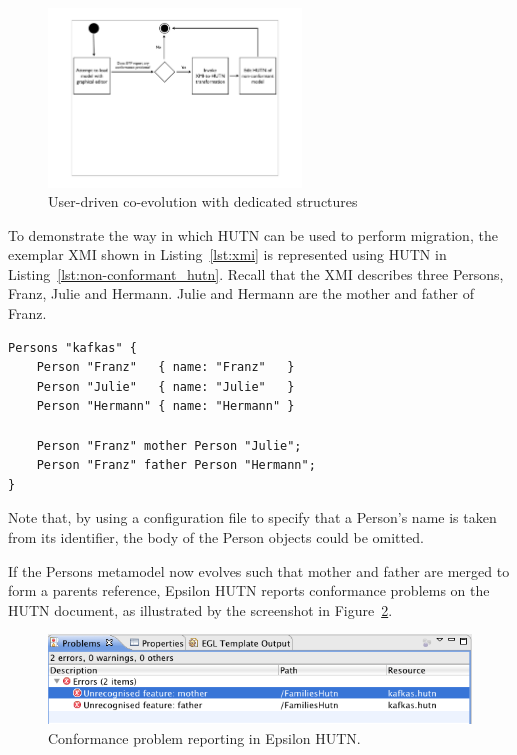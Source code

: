 \begin{figure}[htbp]
	\centering
	\includegraphics*[viewport=80 290 760 550,height=4.75cm]{6.Evaluation/images/user_driven/hutn_process.pdf}
	\caption{User-driven co-evolution with dedicated structures}
	\label{fig:hutn_process_implementation}
\end{figure}

To demonstrate the way in which HUTN can be used to perform migration, the exemplar XMI shown in Listing~\ref{lst:xmi} is represented using HUTN in Listing~\ref{lst:non-conformant_hutn}. Recall that the XMI describes three Persons, Franz, Julie and Hermann. Julie and Hermann are the mother and father of Franz.

\begin{lstlisting}[caption=HUTN for people with mothers and fathers., label=lst:non-conformant_hutn, language=HutnFamilies]
Persons "kafkas" {
    Person "Franz"   { name: "Franz"   }
    Person "Julie"   { name: "Julie"   }
    Person "Hermann" { name: "Hermann" }
    
    Person "Franz" mother Person "Julie";
    Person "Franz" father Person "Hermann";
}
\end{lstlisting}

Note that, by using a configuration file to specify that a Person's name is taken from its identifier, the body of the Person objects could be omitted.

If the Persons metamodel now evolves such that mother and father are merged to form a parents reference, Epsilon HUTN reports conformance problems on the HUTN document, as illustrated by the screenshot in Figure~\ref{fig:hutn_conformance_reporting}.

\begin{figure}[htbp]
  \begin{center}
    \leavevmode
    \includegraphics[scale=0.44]{5.Implementation/hutn_conformance_reporting.png}
  \end{center}
  \caption{Conformance problem reporting in Epsilon HUTN.}
  \label{fig:hutn_conformance_reporting}
\end{figure}

